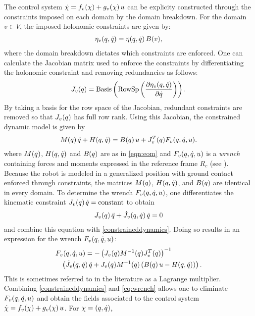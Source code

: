 The control system ${\dot {\chi}} = f_v(\chi) + g_v(\chi) \, u$ can be explicity constructed through the constraints imposed on each domain by the domain breakdown.
%
For the domain $v \in V$, the imposed holonomic constraints are given by:
%
\begin{align}
  \eta_{v}(q, \dot{q}) = \eta(q, \dot{q}) \, B(v),
\end{align}
%
where the domain breakdown dictates which constraints are enforced.
%
One can calculate the Jacobian matrix used to enforce the constraints by differentiating the holonomic constraint and removing redundancies as follows:
%
\begin{align}
  J_{v}(q) = \mathrm{Basis}\left( \mathrm{RowSp}\left( \frac{\partial{\eta_{v}(q, \dot{q})}}{\partial{{\dot{q}}}} \right) \right).
\end{align}
%
By taking a basis for the row space of the Jacobian, redundant constraints are removed so that $J_v(q)$ has full row rank.
%
Using this Jacobian, the constrained dynamic model is given by
%
\begin{align}
  \label{constraineddynamics}
  M(q) \, \ddot{q} + H(q, \dot{q}) = B(q) \, u + J_v^T(q) F_v(q, \dot{q}, u).
\end{align}
%
where $M(q)$, $H(q, \dot{q})$ and $B(q)$ are as in \eqref{eqn:eom} and $F_v(q, \dot{q}, u)$ is a {\em wrench} containing forces and moments expressed in the reference frame $R_c$ (see \cite{MLS94}).
%
Because the robot is modeled in a generalized position with ground contact enforced through constraints, the matrices $M(q)$, $H(q, \dot{q})$, and $B(q)$ are identical in every domain.
%
To determine the wrench $F_v(q, \dot{q}, u)$, one differentiates the kinematic constraint $J_v(q) \, \dot{q} = \mathrm{constant}$ to obtain
%
\begin{align}
  J_{v}(q) \, \ddot{q} + {\dot J}_{v}(q, \dot{q}) \, \dot{q} = 0
\end{align}
%
and combine this equation with \eqref{constraineddynamics}.
%
Doing so results in an expression for the wrench $F_v(q, \dot{q}, u)$:
%
\begin{align}
  \label{eq:wrench}
  \lefteqn{F_{v}\argsqdqu = -\left( J_{v}\argsq \M^{-1}\argsq J_{v}^{T}\argsq \right)^{-1} }\\
  \nonumber
  &&\left( {\dot J}_{v}\argsqdq \, \dq + J_{v}\argsq \M^{-1}\argsq \left( \B\argsq \, \u - \HCor\argsqdq \right) \right).
\end{align}
%
This is sometimes referred to in the literature as a Lagrange multiplier.
%
Combining \eqref{constraineddynamics} and \eqref{eq:wrench} allows one to eliminate $F_{v}(q, \dot{q}, u)$ and obtain the fields associated to the control system ${\dot {\chi}} = f_{v}(\chi) + g_{v}(\chi) \, u$. For $\chi = (q, \dot{q})$,
